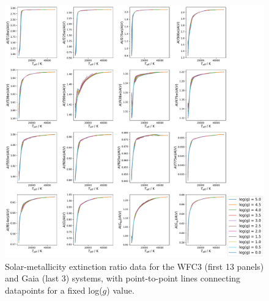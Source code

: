 \documentclass[12pt, a4paper]{report}
\begin{document}
\begin{figure}[h!]
\begin{center}
\includegraphics[width=0.85\paperwidth]{../just_full_data/comb/AHub_FeH0p0_just_Teff_plot_lines.pdf}
\caption{Solar-metallicity extinction ratio data for the WFC3 (first 13 panels) and Gaia (last 3) systems, with point-to-point lines connecting datapoints for a fixed log($g$) value.}
\label{just_data_FeH0_WFC3gaia}
\end{center}
\end{figure}
\end{document}
